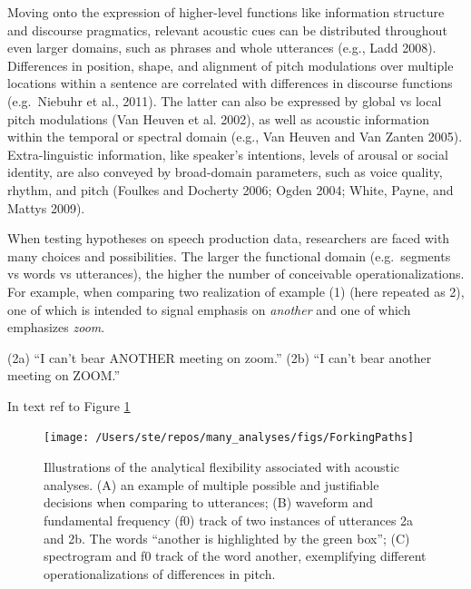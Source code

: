 \documentclass[
  12pt,
]{article}
\begin{document}
Moving onto the expression of higher-level functions like information structure and discourse pragmatics, relevant acoustic cues can be distributed throughout even larger domains, such as phrases and whole utterances (e.g., Ladd 2008).
Differences in position, shape, and alignment of pitch modulations over multiple locations within a sentence are correlated with differences in discourse functions (e.g.~Niebuhr et al., 2011).
The latter can also be expressed by global vs local pitch modulations (Van Heuven et al. 2002), as well as acoustic information within the temporal or spectral domain (e.g., Van Heuven and Van Zanten 2005).
Extra-linguistic information, like speaker's intentions, levels of arousal or social identity, are also conveyed by broad-domain parameters, such as voice quality, rhythm, and pitch (Foulkes and Docherty 2006; Ogden 2004; White, Payne, and Mattys 2009).

When testing hypotheses on speech production data, researchers are faced with many choices and possibilities.
The larger the functional domain (e.g.~segments vs words vs utterances), the higher the number of conceivable operationalizations.
For example, when comparing two realization of example (1) (here repeated as 2), one of which is intended to signal emphasis on \emph{another} and one of which emphasizes \emph{zoom}.

(2a) ``I can't bear ANOTHER meeting on zoom.''
(2b) ``I can't bear another meeting on ZOOM.''

In text ref to Figure \ref{fig:forkingPaths}



\begin{figure}
\texttt{[image: /Users/ste/repos/many\_analyses/figs/ForkingPaths]} \caption{Illustrations of the analytical flexibility associated with acoustic analyses. (A) an example of multiple possible and justifiable decisions when comparing to utterances; (B) waveform and fundamental frequency (f0) track of two instances of utterances 2a and 2b. The words ``another is highlighted by the green box''; (C) spectrogram and f0 track of the word another, exemplifying different operationalizations of differences in pitch.}\label{fig:forkingPaths}
\end{figure}
\end{document}
